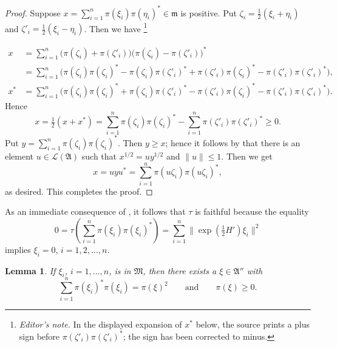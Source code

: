 \documentclass[12pt,b5paper,twoside]{article}
\theoremstyle{takesaki}
\newtheorem{lemma}{Lemma}[section]
\numberwithin{equation}{section}
\newcounter{editorialnote}
\newcommand{\ednote}[1]{%
  \stepcounter{editorialnote}%
  \begingroup
  \renewcommand{\thefootnote}{E\arabic{editorialnote}}%
  \footnote{\textit{Editor's note.} #1}%
  \addtocounter{footnote}{-1}%
  \endgroup
}
\begin{document}
\begin{proof}
Suppose
$x=\sum_{i=1}^{n}\pi(\xi_i)\pi(\eta_i)^*\in\mathfrak m$ is positive.
Put
$\zeta_i=\tfrac12(\xi_i+\eta_i)$ and
$\zeta'_i=\tfrac12(\xi_i-\eta_i)$.  Then we have
\ednote{In the displayed expansion of $x^*$ below, the source prints
a plus sign before
$\pi(\zeta'_i)\pi(\zeta'_i)^*$; the sign has been corrected to minus.}
\begin{align*}
 x
 &=\sum_{i=1}^{n}
   \bigl(\pi(\zeta_i)+\pi(\zeta'_i)\bigr)
   \bigl(\pi(\zeta_i)-\pi(\zeta'_i)\bigr)^*\\
 &=\sum_{i=1}^{n}
   \bigl(\pi(\zeta_i)\pi(\zeta_i)^*
    -\pi(\zeta_i)\pi(\zeta'_i)^*
    +\pi(\zeta'_i)\pi(\zeta_i)^*
    -\pi(\zeta'_i)\pi(\zeta'_i)^*\bigr),\\
 x^*
 &=\sum_{i=1}^{n}
   \bigl(\pi(\zeta_i)\pi(\zeta_i)^*
    +\pi(\zeta_i)\pi(\zeta'_i)^*
    -\pi(\zeta'_i)\pi(\zeta_i)^*
    -\pi(\zeta'_i)\pi(\zeta'_i)^*\bigr).
\end{align*}
Hence
\[
 x=\tfrac12(x+x^*)
  =\sum_{i=1}^{n}\pi(\zeta_i)\pi(\zeta_i)^*
   -\sum_{i=1}^{n}\pi(\zeta'_i)\pi(\zeta'_i)^*\geq0.
\]
Put $y=\sum_{i=1}^{n}\pi(\zeta_i)\pi(\zeta_i)^*$.  Then $y\geq x$;
hence it follows by \cite[Lemma~2, p.~11]{ref3} that there is an
element $u\in\mathcal L(\mathfrak A)$ such that
$x^{1/2}=uy^{1/2}$ and $\|u\|\leq1$.  Then we get
\[
 x=uyu^*=\sum_{i=1}^{n}\pi(u\zeta_i)\pi(u\zeta_i)^*,
\]
as desired.  This completes the proof.
\end{proof}

As an immediate consequence of , it follows that
$\tau$ is faithful because the equality
\[
 0=\tau\!\left(\sum_{i=1}^{n}\pi(\xi_i)\pi(\xi_i)^*\right)
  =\sum_{i=1}^{n}\|\exp(\tfrac12H')\xi_i\|^2
\]
implies $\xi_i=0$, $i=1,2,\ldots,n$.

\begin{lemma}\label{lem:14.5}
If $\xi_i$, $i=1,\ldots,n$, is in $\mathfrak M$, then there exists a
$\xi\in\mathfrak A''$ with
\[
  \sum_{i=1}^{n}\pi(\xi_i)^*\pi(\xi_i)=\pi(\xi)^2
  \qquad\text{and}\qquad \pi(\xi)\geq0.
\]
\end{lemma}
\end{document}
